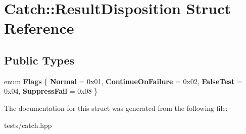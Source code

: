 \hypertarget{struct_catch_1_1_result_disposition}{}\section{Catch\+:\+:Result\+Disposition Struct Reference}
\label{struct_catch_1_1_result_disposition}
\subsection*{Public Types}
\begin{DoxyCompactItemize}
\item 
\mbox{\label{struct_catch_1_1_result_disposition_a3396cad6e2259af326b3aae93e23e9d8}} 
enum {\bfseries Flags} \{ {\bfseries Normal} = 0x01, 
{\bfseries Continue\+On\+Failure} = 0x02, 
{\bfseries False\+Test} = 0x04, 
{\bfseries Suppress\+Fail} = 0x08
 \}
\end{DoxyCompactItemize}


The documentation for this struct was generated from the following file\+:\begin{DoxyCompactItemize}
\item 
tests/catch.\+hpp\end{DoxyCompactItemize}
